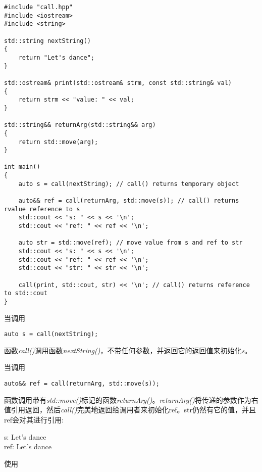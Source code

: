 \begin{lstlisting}[caption={}]
#include "call.hpp"
#include <iostream>
#include <string>

std::string nextString()
{
	return "Let's dance";
}

std::ostream& print(std::ostream& strm, const std::string& val)
{
	return strm << "value: " << val;
}

std::string&& returnArg(std::string&& arg)
{
	return std::move(arg);
}

int main()
{
	auto s = call(nextString); // call() returns temporary object
	
	auto&& ref = call(returnArg, std::move(s)); // call() returns rvalue reference to s
	std::cout << "s: " << s << '\n';
	std::cout << "ref: " << ref << '\n';
	
	auto str = std::move(ref); // move value from s and ref to str
	std::cout << "s: " << s << '\n';
	std::cout << "ref: " << ref << '\n';
	std::cout << "str: " << str << '\n';
	
	call(print, std::cout, str) << '\n'; // call() returns reference to std::cout
}
\end{lstlisting}

当调用\par

\begin{lstlisting}[caption={}]
	auto s = call(nextString);
\end{lstlisting}

函数\textit{call()}调用函数\textit{nextString()}，不带任何参数，并返回它的返回值来初始化\textit{s}。\par

当调用\par

\begin{lstlisting}[caption={}]
	auto&& ref = call(returnArg, std::move(s));
\end{lstlisting}

函数调用带有\textit{std::move()}标记的函数\textit{returnArg()}。\textit{returnArg()}将传递的参数作为右值引用返回，然后\textit{call()}完美地返回给调用者来初始化ref。str仍然有它的值，并且ref会对其进行引用:\par

\begin{tcolorbox}[colback=white,colframe=black]
s: Let's dance \\
ref: Let's dance
\end{tcolorbox}

使用\par

